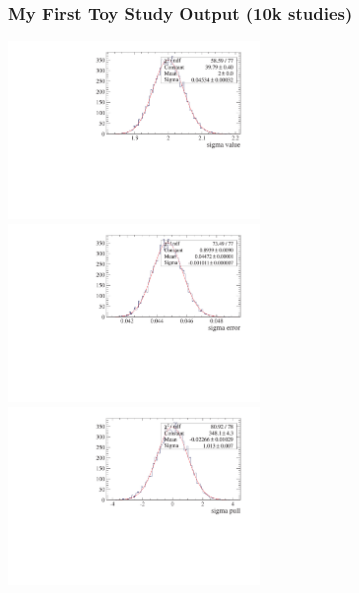 \documentclass{beamer}
\begin{document}
\begin{frame}
\frametitle{My First Toy Study Output (10k studies) }\begin{center}
\includegraphics[width=0.5\textwidth]{./Output-10k/sigma_value_c_thru.pdf}
\includegraphics[width=0.5\textwidth]{./Output-10k/sigma_error_c_thru.pdf}\newline
\includegraphics[width=0.5\textwidth]{./Output-10k/sigma_pull_c_thru.pdf}\end{center}
\end{frame}
\end{document}
